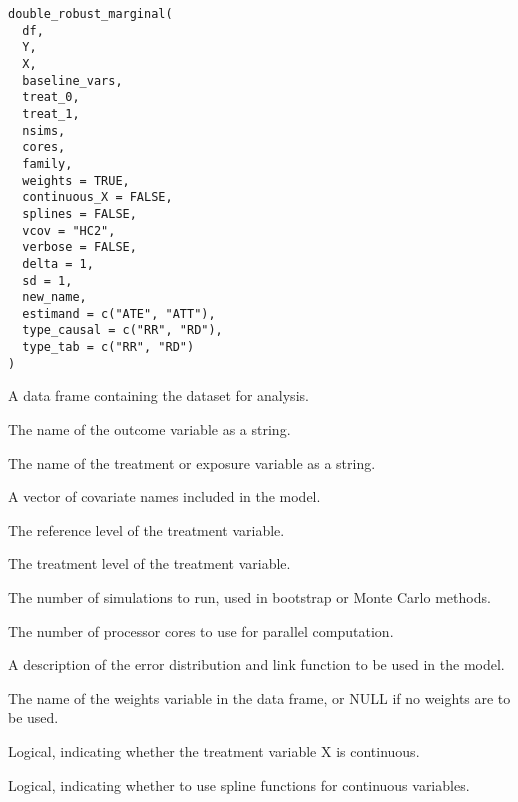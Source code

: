 \documentclass[a4paper]{book}
\begin{document}
%
\begin{Usage}
\begin{verbatim}
double_robust_marginal(
  df,
  Y,
  X,
  baseline_vars,
  treat_0,
  treat_1,
  nsims,
  cores,
  family,
  weights = TRUE,
  continuous_X = FALSE,
  splines = FALSE,
  vcov = "HC2",
  verbose = FALSE,
  delta = 1,
  sd = 1,
  new_name,
  estimand = c("ATE", "ATT"),
  type_causal = c("RR", "RD"),
  type_tab = c("RR", "RD")
)
\end{verbatim}
\end{Usage}
%
\begin{Arguments}
\begin{ldescription}
\item[\code{df}] A data frame containing the dataset for analysis.

\item[\code{Y}] The name of the outcome variable as a string.

\item[\code{X}] The name of the treatment or exposure variable as a string.

\item[\code{baseline\_vars}] A vector of covariate names included in the model.

\item[\code{treat\_0}] The reference level of the treatment variable.

\item[\code{treat\_1}] The treatment level of the treatment variable.

\item[\code{nsims}] The number of simulations to run, used in bootstrap or Monte Carlo methods.

\item[\code{cores}] The number of processor cores to use for parallel computation.

\item[\code{family}] A description of the error distribution and link function to be used in the model.

\item[\code{weights}] The name of the weights variable in the data frame, or NULL if no weights are to be used.

\item[\code{continuous\_X}] Logical, indicating whether the treatment variable X is continuous.

\item[\code{splines}] Logical, indicating whether to use spline functions for continuous variables.


\end{ldescription}
\end{Arguments}
\end{document}
